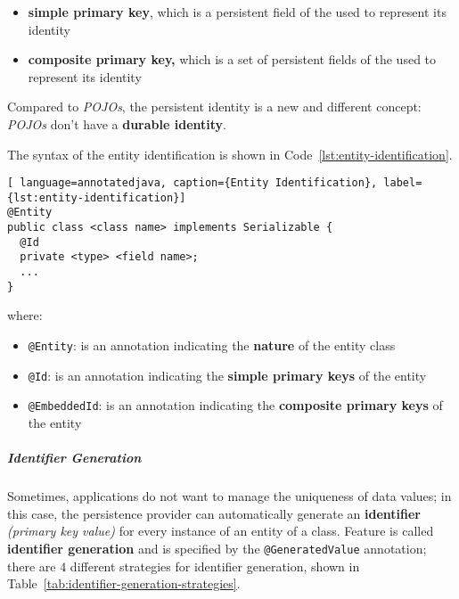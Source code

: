 \documentclass[english]{article}
\begin{document}
\begin{itemize}
  \item \textbf{simple primary key}, which is a persistent field of the \javab used to represent its identity
  \item \textbf{composite primary key,} which is a set of persistent fields of the \javab used to represent its identity
\end{itemize}

Compared to \textit{POJOs}, the persistent identity is a new and different concept: \textit{POJOs} don't have a \textbf{durable identity}.

The syntax of the entity identification is shown in Code~\ref{lst:entity-identification}.

\begin{lstlisting}[ language=annotatedjava, caption={Entity Identification}, label={lst:entity-identification}]
@Entity
public class <class name> implements Serializable {
  @Id
  private <type> <field name>;
  ...
}
\end{lstlisting}

where:
\begin{itemize}[label=\texttt{>}]
  \item \texttt{@Entity}: is an annotation indicating the \textbf{nature} of the entity class
  \item \texttt{@Id}: is an annotation indicating the \textbf{simple primary keys} of the entity
  \item \texttt{@EmbeddedId}: is an annotation indicating the \textbf{composite primary keys} of the entity
\end{itemize}

\subparagraph*{Identifier Generation}
Sometimes, applications do not want to manage the uniqueness of data values;
in this case, the persistence provider can automatically generate an \textbf{identifier} \textit{(primary key value)} for every instance of an entity of a class.
Feature is called \textbf{identifier generation} and is specified by the \texttt{@GeneratedValue} annotation;
there are \(4\) different strategies for identifier generation, shown in Table~\ref{tab:identifier-generation-strategies}.
\end{document}
